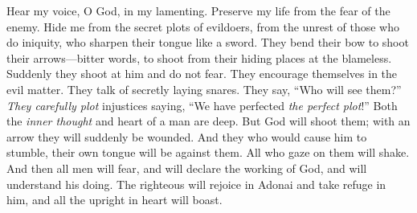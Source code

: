 \begin{biblechapter} %
 Hear my voice, O God, in my lamenting. 
Preserve my life from the fear of the enemy.
\verse Hide me from the secret plots of evildoers, 
from the unrest of those who do iniquity,
\verse who sharpen their tongue like a sword. 
They bend their bow to shoot their arrows—bitter words,
\verse to shoot from their hiding places at the blameless. 
Suddenly they shoot at him and do not fear.
\verse They encourage themselves in the evil matter. 
They talk of secretly laying snares. 
They say, “Who will see them?”
\verse \textit{They carefully plot} injustices saying, 
“We have perfected \textit{the perfect plot}!” 
Both the \textit{inner thought} and heart of a man are deep.
\verse But God will shoot them; 
with an arrow they will suddenly be wounded.
\verse {} And they who would cause him to stumble, 
their own tongue will be against them. 
All who gaze on them will shake.
\verse And then all men will fear, 
and will declare the working of God, 
and will understand his doing.
\verse The righteous will rejoice in Adonai and take refuge in him, 
and all the upright in heart will boast.
\end{biblechapter}


